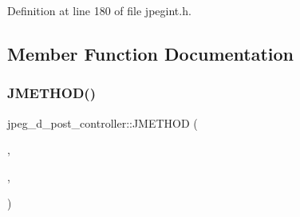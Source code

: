 Definition at line 180 of file jpegint.\+h.



\subsection{Member Function Documentation}
\mbox{\label{structjpeg__d__post__controller_a349b2ff7508568d13a9294f3e79163aa}} 
\subsubsection{\texorpdfstring{JMETHOD()}{JMETHOD()}\hspace{0.1cm}{\footnotesize\ttfamily [1/2]}}
{\footnotesize\ttfamily jpeg\+\_\+d\+\_\+post\+\_\+controller\+::\+J\+M\+E\+T\+H\+OD (\begin{DoxyParamCaption}\item[{void}]{,  }\item[{\mbox{\hyperlink{jddctmgr_8c_a1964f006adb8fb80f57e455f6452aec1}{start\+\_\+pass}}}]{,  }\item[{(\mbox{\hyperlink{jpeglib_8h_a00c7d78af44bd26a901c791ccfc1e178}{j\+\_\+decompress\+\_\+ptr}} cinfo, \mbox{\hyperlink{jpegint_8h_a1f0803342372ac62b6903c399399c874}{J\+\_\+\+B\+U\+F\+\_\+\+M\+O\+DE}} pass\+\_\+mode)}]{ }\end{DoxyParamCaption})}

\mbox{\label{structjpeg__d__post__controller_adb337adcfe3a314ceac4b626a73d87c3}} 
